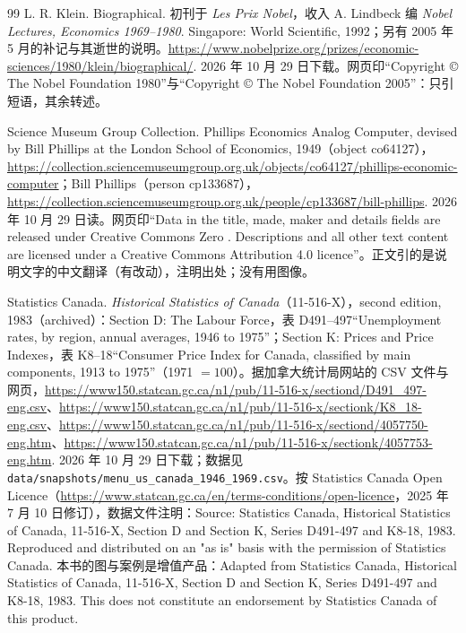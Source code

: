 \begin{thebibliography}{99}
 L. R. Klein. Biographical. 初刊于 \emph{Les Prix Nobel}，收入 A. Lindbeck 编 \emph{Nobel Lectures, Economics 1969--1980}. Singapore: World Scientific, 1992；另有 2005 年 5 月的补记与其逝世的说明。\url{https://www.nobelprize.org/prizes/economic-sciences/1980/klein/biographical/}. 2026 年 10 月 29 日下载。网页印“Copyright © The Nobel Foundation 1980”与“Copyright © The Nobel Foundation 2005”：只引短语，其余转述。

 Science Museum Group Collection. Phillips Economics Analog Computer, devised by Bill Phillips at the London School of Economics, 1949（object co64127），\url{https://collection.sciencemuseumgroup.org.uk/objects/co64127/phillips-economic-computer}；Bill Phillips（person cp133687），\url{https://collection.sciencemuseumgroup.org.uk/people/cp133687/bill-phillips}. 2026 年 10 月 29 日读。网页印“Data in the title, made, maker and details fields are released under Creative Commons Zero . Descriptions and all other text content are licensed under a Creative Commons Attribution 4.0 licence”。正文引的是说明文字的中文翻译（有改动），注明出处；没有用图像。

 Statistics Canada. \emph{Historical Statistics of Canada}（11-516-X），second edition, 1983（archived）：Section D: The Labour Force，表 D491--497“Unemployment rates, by region, annual averages, 1946 to 1975”；Section K: Prices and Price Indexes，表 K8--18“Consumer Price Index for Canada, classified by main components, 1913 to 1975”（1971 $=100$）。据加拿大统计局网站的 CSV 文件与网页，\url{https://www150.statcan.gc.ca/n1/pub/11-516-x/sectiond/D491_497-eng.csv}、\url{https://www150.statcan.gc.ca/n1/pub/11-516-x/sectionk/K8_18-eng.csv}、\url{https://www150.statcan.gc.ca/n1/pub/11-516-x/sectiond/4057750-eng.htm}、\url{https://www150.statcan.gc.ca/n1/pub/11-516-x/sectionk/4057753-eng.htm}. 2026 年 10 月 29 日下载；数据见 \texttt{data/snapshots/menu\_us\_canada\_1946\_1969.csv}。按 Statistics Canada Open Licence（\url{https://www.statcan.gc.ca/en/terms-conditions/open-licence}，2025 年 7 月 10 日修订），数据文件注明：Source: Statistics Canada, Historical Statistics of Canada, 11-516-X, Section D and Section K, Series D491-497 and K8-18, 1983. Reproduced and distributed on an "as is" basis with the permission of Statistics Canada. 本书的图与案例是增值产品：Adapted from Statistics Canada, Historical Statistics of Canada, 11-516-X, Section D and Section K, Series D491-497 and K8-18, 1983. This does not constitute an endorsement by Statistics Canada of this product.


\end{thebibliography}
